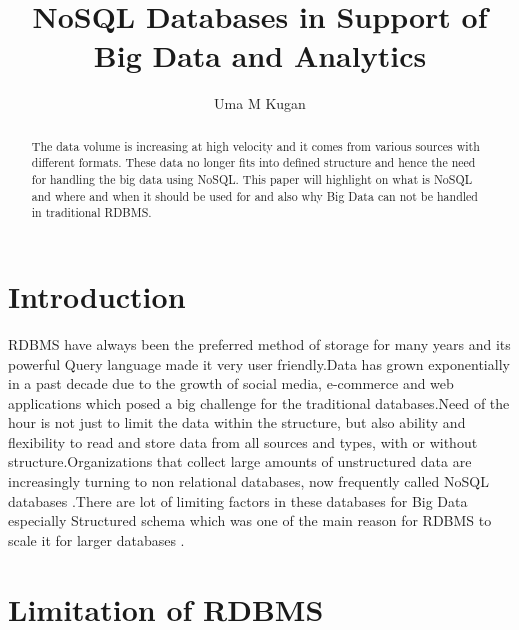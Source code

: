 \documentclass[sigconf]{acmart}
\begin{document}
\title{NoSQL Databases in Support of Big Data and Analytics}


\author{Uma M Kugan}

\renewcommand{\shortauthors}{Uma}


\begin{abstract}
The data volume is increasing at high velocity and it comes from various sources with different formats. These data no longer fits into defined structure and hence the need for handling the big data using NoSQL. This paper will highlight on what is NoSQL and where and when it should be used for and also why Big Data can not be handled in traditional RDBMS.
\end{abstract}



\maketitle

\section{Introduction}

RDBMS have always been the preferred method of storage for many years and its powerful Query language made it very user friendly.Data has grown exponentially in a past decade due to the growth of social media, e-commerce and web applications which posed a big challenge for the traditional databases.Need of the hour is not just to limit the data within the structure, but also ability and flexibility to read and store data from all sources and types, with or without structure.Organizations that collect large amounts of unstructured data are increasingly turning to non relational databases, now frequently called NoSQL databases \cite{neal}.There are lot of limiting factors in these databases for Big Data especially Structured schema which was one of the main reason for RDBMS to scale it for larger databases \cite{aspire}.

\section{Limitation of RDBMS}
\end{document}
